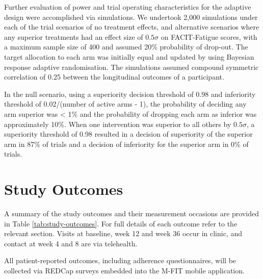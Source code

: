 \documentclass[11pt,parskip=half-]{scrartcl}
\begin{document}
Further evaluation of power and trial operating characteristics for the adaptive design were accomplished via simulations. We undertook 2,000 simulations under each of the trial scenarios of no treatment effects, and alternative scenarios where any superior treatments had an effect size of $0.5\sigma$ on FACIT-Fatigue scores, with a maximum sample size of 400 and assumed 20\% probability of drop-out. The target allocation to each arm was initially equal and updated by using Bayesian response adaptive randomisation. The simulations assumed compound symmetric correlation of 0.25 between the longitudinal outcomes of a participant.

In the null scenario, using a superiority decision threshold of 0.98 and inferiority threshold of 0.02/(number of active arms - 1), the probability of deciding any arm superior was < 1\% and the probability of dropping each arm as inferior was approximately 10\%. When one intervention was superior to all others by $0.5\sigma$, a superiority threshold of 0.98 resulted in a decision of superiority of the superior arm in 87\% of trials and a decision of inferiority for the superior arm in 0\% of trials.

\clearpage

\section{Study Outcomes}\label{outcomes}

A summary of the study outcomes and their measurement occasions are provided in Table \ref{tab:study-outcomes}. For full details of each outcome refer to the relevant section. Visits at baseline, week 12 and week 36 occur in clinic, and contact at week 4 and 8 are via telehealth.

All patient-reported outcomes, including adherence questionnaires, will be collected via REDCap surveys embedded into the M-FIT mobile application.
\end{document}
